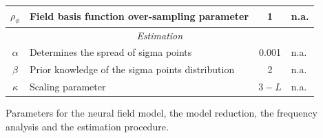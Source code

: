 \documentclass[10pt]{article}
\begin{document}
\begin{table}[!ht]
\begin{tabular}{|c|l|c|l|}
	$\rho_\phi$ & Field basis function over-sampling parameter & 1 & n.a.\\
	\hline 
	\multicolumn{4}{|c|}{\emph{Estimation}}\\
	\hline
	$\alpha$& Determines the spread of sigma points & 0.001 & n.a.\\
	$\beta$& Prior knowledge of the sigma points distribution & 2 & n.a.\\
	$\kappa$& Scaling parameter & $3-L$ & n.a.\\
	\hline
\end{tabular}
\begin{flushleft}Parameters for the neural field model, the model reduction, the frequency analysis and the estimation procedure.
\end{flushleft}
\label{tab:Parameters}
\end{table}
	
\end{document}

